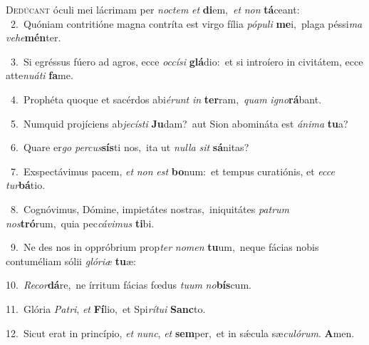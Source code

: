 \lettrine{\initial\textcolor{\initialcolor}{D}}{edúcant} óculi mei lácrimam per \textit{noc}\-\textit{tem} \textit{et} \textbf{di}\-em,~\star \textit{et} \textit{non} \textbf{tá}\-ceant:\\
{\numbfont\textcolor{\numbcolor}{~2.}}~Quóniam contritióne magna contríta est virgo fília \textit{pó}\-\textit{pu}\textit{li} \textbf{me}\-i,~\star plaga péssi\textit{ma} \textit{ve}\-\textit{he}\textbf{mén}ter.\par
{\numbfont\textcolor{\numbcolor}{~3.}}~Si egréssus fúero ad agros, ecce \textit{oc}\-\textit{cí}\textit{si} \textbf{glá}\-dio:~\star et si introíero in civitátem, ecce atte\-\textit{nu}\-\textit{á}\textit{ti} \textbf{fa}\-me.\par
{\numbfont\textcolor{\numbcolor}{~4.}}~Prophéta quoque et sacérdos abi\-\textit{é}\-\textit{runt} \textit{in} \textbf{ter}\-ram,~\star \textit{quam} \textit{i}\-\textit{gno}\textbf{rá}bant.\par
{\numbfont\textcolor{\numbcolor}{~5.}}~Numquid projíciens ab\-\textit{je}\-\textit{cís}\textit{ti} \textbf{Ju}\-dam?~\star aut Sion abomináta est \textit{á}\-\textit{ni}\textit{ma} \textbf{tu}\-a?\par
{\numbfont\textcolor{\numbcolor}{~6.}}~Quare er\textit{go} \textit{per}\-\textit{cus}\textbf{sís}ti nos,~\star ita ut \textit{nul}\-\textit{la} \textit{sit} \textbf{sá}\-nitas?\par
{\numbfont\textcolor{\numbcolor}{~7.}}~Exspectávimus pacem, \textit{et} \textit{non} \textit{est} \textbf{bo}\-num:~\star et tempus curatiónis, et \textit{ec}\-\textit{ce} \textit{tur}\-\textbf{bá}tio.\par
{\numbfont\textcolor{\numbcolor}{~8.}}~Cognóvimus, Dómine, impietátes nostras,~\dagger iniquitátes \textit{pa}\-\textit{trum} \textit{nos}\-\textbf{tró}rum,~\star quia pec\-\textit{cá}\-\textit{vi}\textit{mus} \textbf{ti}\-bi.\par
{\numbfont\textcolor{\numbcolor}{~9.}}~Ne des nos in oppróbrium prop\textit{ter} \textit{no}\-\textit{men} \textbf{tu}\-um,~\star neque fácias nobis contuméliam sólii \textit{gló}\-\textit{ri}\textit{æ} \textbf{tu}\-æ:\par
{\numbfont\textcolor{\numbcolor}{10.}}~\-\textit{Re}\-\textit{cor}\textbf{dá}re,~\star ne írritum fácias fœdus \textit{tu}\-\textit{um} \textit{no}\-\textbf{bís}cum.\par
{\numbfont\textcolor{\numbcolor}{11.}}~Glória \textit{Pa}\-\textit{tri}, \textit{et} \textbf{Fí}\-lio,~\star et Spi\-\textit{rí}\-\textit{tu}\textit{i} \textbf{Sanc}\-to.\par
{\numbfont\textcolor{\numbcolor}{12.}}~Sicut erat in princípio, \textit{et} \textit{nunc}\-, \textit{et} \textbf{sem}\-per,~\star et in sǽcula sæ\-\textit{cu}\-\textit{ló}\textit{rum}. \textbf{A}\-men.\par

